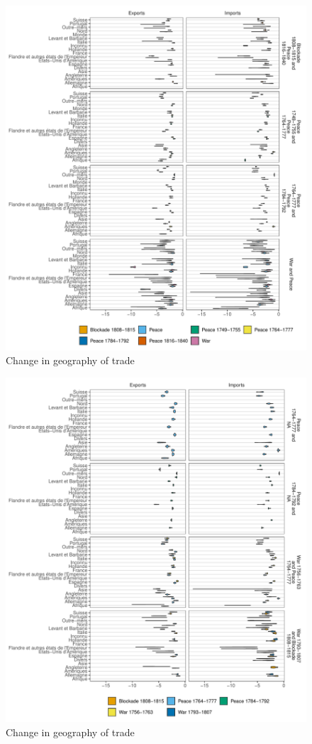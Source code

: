 \documentclass[12pt,a4paper,notitlepage,english]{article}
\begin{document}
\begin{appendix}
\begin{figure}[h!]
\caption{Change in geography of trade}
\label{fig:violin_nat_pays1_XI1}
\includegraphics[scale=.9]{violin_nat_pays1_XI1}
\end{figure}
\begin{figure}[h!]
\caption{Change in geography of trade}
\label{fig:violin_nat_pays1_XI2}
\includegraphics[scale=.9]{violin_nat_pays1_XI2}
\end{figure}


\end{appendix}
\end{document}
